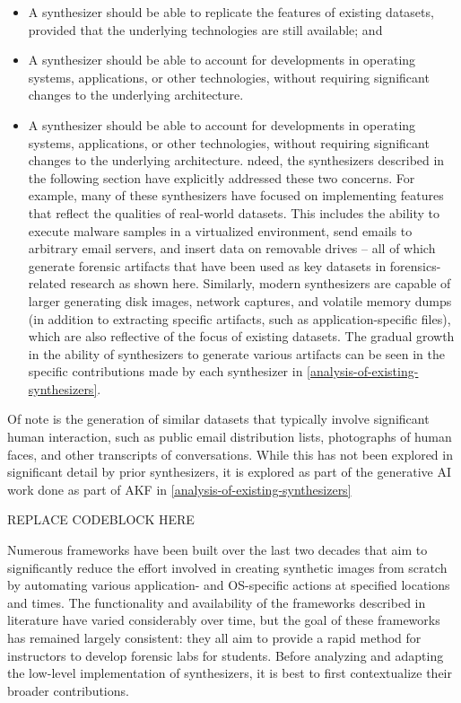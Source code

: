 \begin{itemize}
\item
  A synthesizer should be able to replicate the features of existing
  datasets, provided that the underlying technologies are still
  available; and
\item
  A synthesizer should be able to account for developments in operating
  systems, applications, or other technologies, without requiring
  significant changes to the underlying architecture.
\item
  A synthesizer should be able to account for developments in operating
  systems, applications, or other technologies, without requiring
  significant changes to the underlying architecture. ndeed, the
  synthesizers described in the following section have explicitly
  addressed these two concerns. For example, many of these synthesizers
  have focused on implementing features that reflect the qualities of
  real-world datasets. This includes the ability to execute malware
  samples in a virtualized environment, send emails to arbitrary email
  servers, and insert data on removable drives -- all of which generate
  forensic artifacts that have been used as key datasets in
  forensics-related research as shown here. Similarly, modern
  synthesizers are capable of larger generating disk images, network
  captures, and volatile memory dumps (in addition to extracting
  specific artifacts, such as application-specific files), which are
  also reflective of the focus of existing datasets. The gradual growth
  in the ability of synthesizers to generate various artifacts can be
  seen in the specific contributions made by each synthesizer in
  \ref{analysis-of-existing-synthesizers}.
\end{itemize}

Of note is the generation of similar datasets that typically involve
significant human interaction, such as public email distribution lists,
photographs of human faces, and other transcripts of conversations.
While this has not been explored in significant detail by prior
synthesizers, it is explored as part of the generative AI work done as
part of AKF in \ref{analysis-of-existing-synthesizers}\label{analysis-of-existing-synthesizers}

REPLACE CODEBLOCK HERE

Numerous frameworks have been built over the last two decades that aim
to significantly reduce the effort involved in creating synthetic images
from scratch by automating various application- and OS-specific actions
at specified locations and times. The functionality and availability of
the frameworks described in literature have varied considerably over
time, but the goal of these frameworks has remained largely consistent:
they all aim to provide a rapid method for instructors to develop
forensic labs for students. Before analyzing and adapting the low-level
implementation of synthesizers, it is best to first contextualize their
broader contributions.

